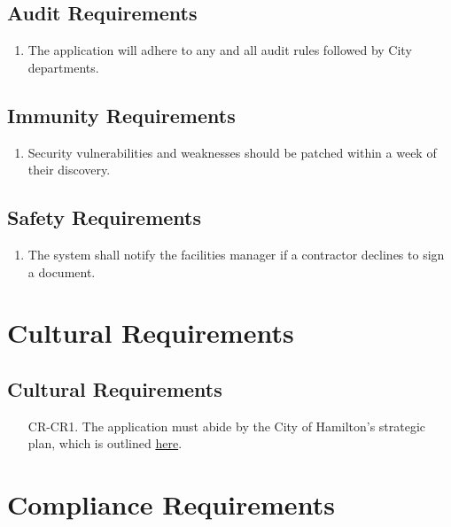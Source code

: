 \documentclass[12pt]{article}
\begin{document}
\subsection{Audit Requirements}
\begin{enumerate} [{SR-AU}1.]
  \item The application will adhere to any and all audit rules followed by City
    departments.
\end{enumerate}
\subsection{Immunity Requirements}
\begin{enumerate} [{SR-IMR}1.]
  \item Security vulnerabilities and weaknesses should be patched
    within a week of their discovery.
\end{enumerate}
\subsection{Safety Requirements}
\begin{enumerate}[{SR-S}1.]
  \item The system shall notify the facilities manager if a contractor declines
    to sign a document.
\end{enumerate}

\section{Cultural Requirements}
\subsection{Cultural Requirements}
\begin{enumerate}[{CR-CR}1.]
  \item[CR-CR1.] The application must abide by the City of Hamilton's
    strategic plan, which is outlined
    \href{https://www.hamilton.ca/city-council/plans-strategies/strategies/2016-2025-strategic-plan}{here}.
\end{enumerate}

\section{Compliance Requirements}
\end{document}
